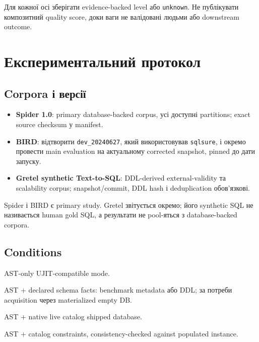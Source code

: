 \documentclass[11pt,a4paper]{article}
\newcommand{\unknown}{\texttt{unknown}}
\begin{document}
Для кожної осі зберігати evidence-backed level або \unknown. Не публікувати
композитний quality score, доки ваги не валідовані людьми або downstream outcome.

\section{Експериментальний протокол}

\subsection{Corpora і версії}

\begin{itemize}
\item \textbf{Spider 1.0}: primary database-backed corpus, усі доступні partitions;
      exact source checksum у manifest.
\item \textbf{BIRD}: відтворити \texttt{dev\_20240627}, який використовував
      \texttt{sqlsure}, і окремо провести main evaluation на актуальному corrected
      snapshot, pinned до дати запуску.
\item \textbf{Gretel synthetic Text-to-SQL}: DDL-derived external-validity та
      scalability corpus; snapshot/commit, DDL hash і deduplication обов'язкові.
\end{itemize}

Spider і BIRD є primary study. Gretel звітується окремо; його synthetic SQL не
називається human gold SQL, а результати не pool-яться з database-backed corpora.

\subsection{Conditions}

\begin{description}[leftmargin=1.5cm,labelwidth=1.1cm]
\item[C0] AST-only UJIT-compatible mode.
\item[C1] AST + declared schema facts: benchmark metadata або DDL; за потреби
          acquisition через materialized empty DB.
\item[C2] AST + native live catalog shipped database.
\item[C3] AST + catalog constraints, consistency-checked against populated instance.
\end{description}
\end{document}
